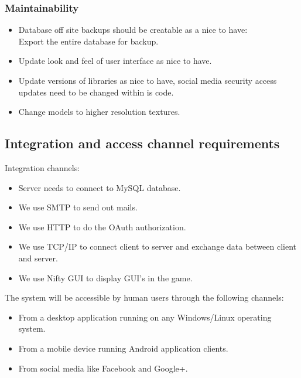 \documentclass[letterpaper]{article}
\begin{document}
				\subsubsection*{Maintainability}
				\vspace{0.1in}
				
					\begin{itemize}
						\item Database off site backups should be creatable as a nice to have: \\
								Export the entire database for backup.
						\item Update look and feel of user interface as nice to have.
						\item Update versions of libraries as nice to have, social media security access updates need to be changed within is code.
						\item Change models to higher resolution textures.
					\end{itemize}
				
			\vspace{0.2in}
			\subsection*{ Integration and access channel requirements }
			\vspace{0.1in}
			
				\hspace{5mm}Integration channels:
					\begin{itemize}
						\item Server needs to connect to MySQL database.
						\item We use SMTP to send out mails.
						\item We use HTTP to do the OAuth authorization.
						\item We use TCP/IP to connect client to server and exchange data between client and server.
						\item We use Nifty GUI to display GUI's in the game.
					\end{itemize}
				
				\newpage			
				
				The system will be accessible by human users through the following channels:
				\begin{itemize}
					\item From a desktop application running on any Windows/Linux operating system.
					\item From a mobile device running Android application clients.
					\item From social media like Facebook and Google+.
				\end{itemize}
				
\end{document}
